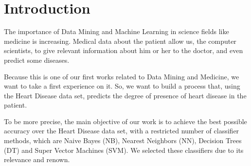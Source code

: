 \section{Introduction}
The importance of Data Mining and Machine Learning in science fields like medicine is increasing. Medical data about the patient allow us, the computer scientists, to give relevant information about him or her to the doctor, and even predict some diseases.

Because this is one of our first works related to Data Mining and Medicine, we want to take a first experience on it. So, we want to build a process that, using the Heart Disease data set, predicts the degree of presence of heart disease in the patient.

To be more precise, the main objective of our work is to achieve the best possible accuracy over the Heart Disease data set, with a restricted number of classifier methods, which are Naive Bayes (NB), Nearest Neighbors (NN), Decision Trees (DT) and Super Vector Machines (SVM). We selected these classifiers due to its relevance and renown. 
